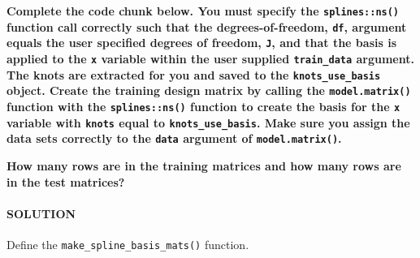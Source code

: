 \documentclass[
]{article}
\newenvironment{Shaded}{\begin{snugshade}}{\end{snugshade}}
\newcommand{\AttributeTok}[1]{\textcolor[rgb]{0.77,0.63,0.00}{#1}}
\newcommand{\ControlFlowTok}[1]{\textcolor[rgb]{0.13,0.29,0.53}{\textbf{#1}}}
\newcommand{\FunctionTok}[1]{\textcolor[rgb]{0.00,0.00,0.00}{#1}}
\newcommand{\NormalTok}[1]{#1}
\newcommand{\OtherTok}[1]{\textcolor[rgb]{0.56,0.35,0.01}{#1}}
\newcommand{\SpecialCharTok}[1]{\textcolor[rgb]{0.00,0.00,0.00}{#1}}
\begin{document}
\textbf{Complete the code chunk below. You must specify the
\texttt{splines::ns()} function call correctly such that the
degrees-of-freedom, \texttt{df}, argument equals the user specified
degrees of freedom, \texttt{J}, and that the basis is applied to the
\texttt{x} variable within the user supplied \texttt{train\_data}
argument. The knots are extracted for you and saved to the
\texttt{knots\_use\_basis} object. Create the training design matrix by
calling the \texttt{model.matrix()} function with the
\texttt{splines::ns()} function to create the basis for the \texttt{x}
variable with \texttt{knots} equal to \texttt{knots\_use\_basis}. Make
sure you assign the data sets correctly to the \texttt{data} argument of
\texttt{model.matrix()}.}

\textbf{How many rows are in the training matrices and how many rows are
in the test matrices?}

\hypertarget{solution-13}{%
\paragraph{SOLUTION}\label{solution-13}}

Define the \texttt{make\_spline\_basis\_mats()} function.

\begin{Shaded}
\end{Shaded}
\end{document}

